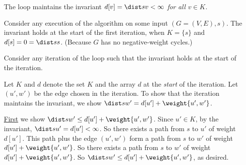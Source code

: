 \begin{lemma}\label{greedy: lemma: dijkstra invariant}
  The loop maintains the invariant
  \emph{$d[v] = \dist s  v < \infty$ for all $v\in K$.}
\end{lemma}
\begin{longFormProof}
  \step Consider any execution of the algorithm on some input $(G=(V,E), s)$.
  \step The invariant holds at the start of the first iteration,
  when $K=\{s\}$ and $d[s] = 0 = \dist s s$.
  (Because $G$ has no negative-weight cycles.)

  \begin{block}
    \step Consider any iteration of the loop such that the invariant holds at the start of the iteration.

    \step Let $K$ and $d$ denote the set $K$ and the array $d$ at the \emph{start} of the iteration.
    \step Let $(u',w')$ be the edge chosen in the iteration.
    \step To show that the iteration maintains the invariant,
    we show $\dist s {w'} = d[u'] + \weight {u', w'}$.

    \smallskip
    \step \underline{First} we show $\dist s {w'} \le d[u'] + \weight {u', w'}$.
    \step Since $u'\in K$, by the invariant, $\dist s {u'} = d[u'] < \infty$.
    \step So there exists a path from $s$ to $u'$ of weight $d[u']$.
    \step This path plus the edge $(u', w')$ form a path from $s$ to $w'$ of weight $d[u'] + \weight {u', w'}$.
    \step So there exists a path from $s$ to $w'$ of weight $d[u'] + \weight {u', w'}$.
    \step[greedy: lt] So $\dist s {w'} \le d[u'] + \weight {u', w'}$, as desired.


\end{block}
\end{longFormProof}

